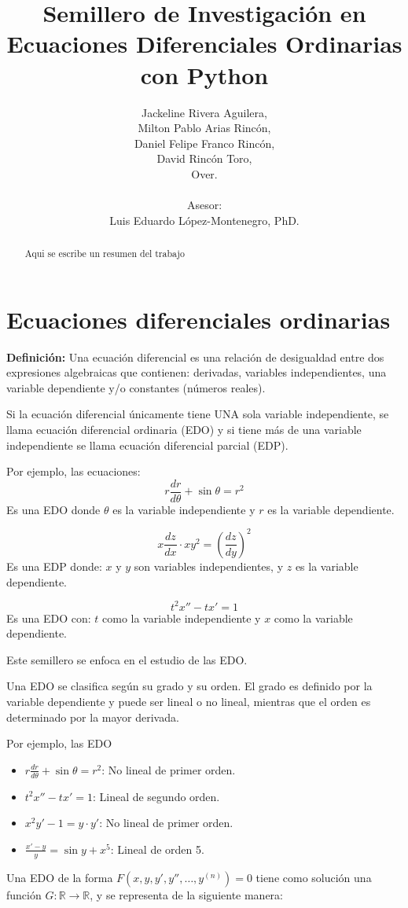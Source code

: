 \documentclass[12pt,letterpaper]{article}
\title{Semillero de Investigación en Ecuaciones Diferenciales Ordinarias con Python}
\author{Jackeline Rivera Aguilera,\\
Milton Pablo Arias Rincón, \\
Daniel Felipe Franco Rincón,\\
David Rincón Toro,\\
Over.
\\\\
Asesor:\\
Luis Eduardo López-Montenegro, PhD.
}
\date{}
\begin{document}
\maketitle
\begin{abstract}
 Aqui se escribe un resumen del trabajo  
\end{abstract}

\section{Ecuaciones diferenciales ordinarias}
\textbf{Definición:} Una ecuación diferencial es una relación de desigualdad entre dos expresiones algebraicas que contienen: derivadas, variables independientes, una variable dependiente y/o constantes (números reales).

Si la ecuación diferencial únicamente tiene UNA sola variable independiente, se llama ecuación diferencial ordinaria (EDO) y si tiene más de una variable independiente se llama ecuación diferencial parcial (EDP).

Por ejemplo, las ecuaciones:
\[ r \frac{dr}{d\theta} + \sin \theta = r^2 \]Es una EDO donde $\theta$ es la variable independiente y $r$ es la variable dependiente.

\[x \frac{dz}{dx} \cdot xy^2 = \left(\frac{dz}{dy}\right)^2\]
Es una EDP donde: $x$ y $y$ son variables independientes, y $z$ es la variable dependiente.

\[t^2 x'' - tx' = 1\]
Es una EDO con: $t$ como la variable independiente y $x$ como la variable dependiente.

Este semillero se enfoca en el estudio de las EDO.

Una EDO se clasifica según su grado y su orden. El grado es definido por la variable dependiente y puede ser lineal o no lineal, mientras que el orden es determinado por la mayor derivada.

Por ejemplo, las EDO

\begin{itemize}
  \item $r \frac{dr}{d\theta} + \sin\theta = r^2$: No lineal de primer orden.
  \item $t^2 x'' - tx' = 1$: Lineal de segundo orden.
  \item $x^2 y' - 1 = y \cdot y'$: No lineal de primer orden.
  \item $\frac{x' - y}{y} = \sin y + x^5$: Lineal de orden 5.
\end{itemize}

Una EDO de la forma $F(x, y, y', y'', \ldots, y^{(n)}) = 0$ tiene como solución una función $G: \mathbb{R} \rightarrow \mathbb{R}$, y se representa de la siguiente manera:
\end{document}
